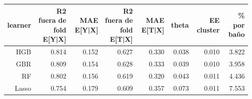 \begin{tabular}{rrrrrrrr}
\toprule
learner & R2 fuera de fold E[Y|X] & MAE E[Y|X] & R2 fuera de fold E[T|X] & MAE E[T|X] & theta & EE cluster & \% por baño \\
\midrule
HGB & 0.814 & 0.152 & 0.627 & 0.330 & 0.038 & 0.010 & 3.822 \\
GBR & 0.809 & 0.154 & 0.628 & 0.333 & 0.039 & 0.010 & 3.958 \\
RF & 0.802 & 0.156 & 0.619 & 0.320 & 0.043 & 0.011 & 4.436 \\
Lasso & 0.754 & 0.179 & 0.609 & 0.357 & 0.073 & 0.011 & 7.553 \\
\bottomrule
\end{tabular}